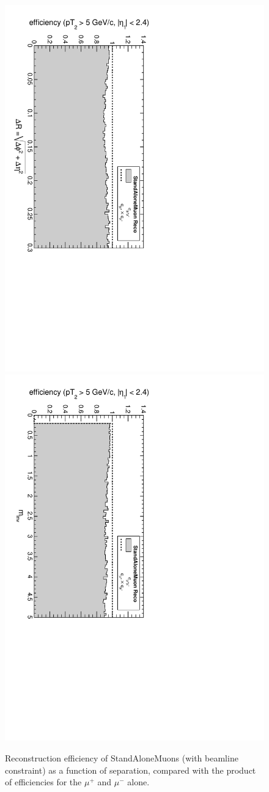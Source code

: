 \documentclass[12pt]{article}
\begin{document}
\begin{figure}[p]
\includegraphics[height=0.5\linewidth, angle=90]{fig/acceptance6_plot/vsdR_StandAloneUpdatedDefault.pdf}
\includegraphics[height=0.5\linewidth, angle=90]{fig/acceptance6_plot/vsmass_StandAloneUpdatedDefault.pdf}

\caption{Reconstruction efficiency of StandAloneMuons (with beamline constraint) as a function of
  separation, compared with the product of efficiencies for the
  $\mu^+$ and $\mu^-$ alone. \label{fig:vseverything_StandAloneUpdatedDefault}}
\end{figure}
\end{document}
